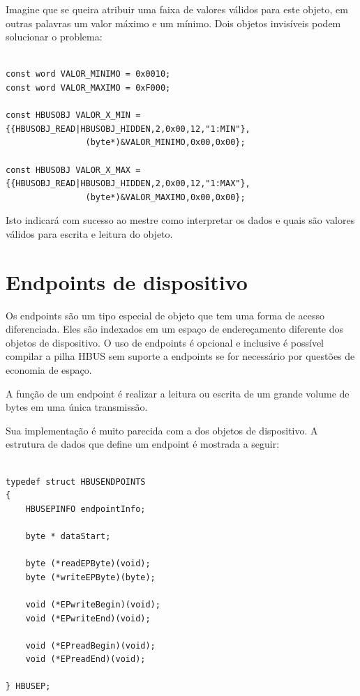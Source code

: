 \documentclass[11pt]{report}
\begin{document}
Imagine que se queira atribuir uma faixa de valores válidos para este objeto, em outras palavras um valor máximo e um mínimo. Dois objetos invisíveis podem solucionar o problema:

\begin{verbatim}

const word VALOR_MINIMO = 0x0010;
const word VALOR_MAXIMO = 0xF000;

const HBUSOBJ VALOR_X_MIN = {{HBUSOBJ_READ|HBUSOBJ_HIDDEN,2,0x00,12,"1:MIN"},
				(byte*)&VALOR_MINIMO,0x00,0x00};
								
const HBUSOBJ VALOR_X_MAX = {{HBUSOBJ_READ|HBUSOBJ_HIDDEN,2,0x00,12,"1:MAX"},
				(byte*)&VALOR_MAXIMO,0x00,0x00};

\end{verbatim}

Isto indicará com sucesso ao mestre como interpretar os dados e quais são valores válidos para escrita e leitura do objeto.

\section{Endpoints de dispositivo}

Os endpoints são um tipo especial de objeto que tem uma forma de acesso diferenciada. Eles são indexados em um espaço de endereçamento diferente dos objetos de dispositivo. O uso de endpoints é opcional e inclusive é possível compilar a pilha HBUS sem suporte a endpoints se for necessário por questões de economia de espaço.

A função de um endpoint é realizar a leitura ou escrita de um grande volume de bytes em uma única transmissão.

Sua implementação é muito parecida com a dos objetos de dispositivo. A estrutura de dados que define um endpoint é mostrada a seguir:

\begin{verbatim}

typedef struct HBUSENDPOINTS
{
	HBUSEPINFO endpointInfo;
	
	byte * dataStart;
	
	byte (*readEPByte)(void);
	byte (*writeEPByte)(byte);
	
	void (*EPwriteBegin)(void);
	void (*EPwriteEnd)(void);
	
	void (*EPreadBegin)(void);
	void (*EPreadEnd)(void);
	
} HBUSEP;

\end{verbatim}
\end{document}
